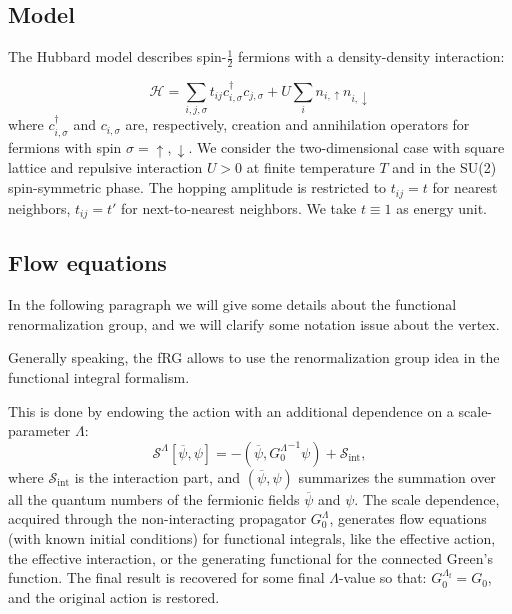 
\subsection{Model}

The Hubbard model\cite{Hubbard1963} describes spin-$\frac{1}{2}$ fermions with a density-density interaction:

\begin{equation}
\mathcal{H} = \sum_{i,j,\sigma} t_{ij} c^{\dagger}_{i,\sigma} c_{j,\sigma} + U \sum_{i} n_{i,\uparrow} n_{i,\downarrow}
\end{equation}
where $c^{\dagger}_{i,\sigma}$ and $c_{i,\sigma}$ are, respectively, creation and annihilation operators 
for fermions with spin $\sigma=\uparrow,\downarrow$. We consider the two-dimensional case with square lattice and repulsive interaction $U>0$ at finite temperature $T$ and in the SU(2) spin-symmetric phase. The hopping amplitude is restricted to $t_{ij} = t$ for nearest neighbors, $t_{ij}=t'$ for next-to-nearest neighbors. We take $t\equiv1$ as energy unit. 


\subsection{Flow equations}


In the following paragraph we will give some details about the functional renormalization group\cite{Metzner2012,Platt2013}, and we will clarify some notation issue about the vertex. 

Generally speaking, the fRG allows to use the renormalization group idea in the functional integral formalism. 

This is done by endowing the action with an additional dependence on a scale-parameter $\Lambda$:\cite{Metzner2012,Platt2013} 
\begin{equation}
 \mathcal{S}^\Lambda[\overline\psi,\psi]=
-(\overline\psi,{G_0^\Lambda}^{-1}\psi)+\mathcal{S}_{\mathrm{int}},  
\end{equation} 
where $\mathcal{S}_{\mathrm{int}}$ is the interaction part, and $(\overline\psi,\psi)$ summarizes the summation over all the quantum numbers of the fermionic fields  $\overline \psi$ and $\psi$. 
The scale dependence, acquired through the non-interacting propagator $G_0^\Lambda$, generates flow equations\cite{Wetterich1993} (with known initial conditions) for functional integrals, like the effective action, the effective interaction, or the generating functional for the connected Green's function. 
The final result is recovered for some final $\Lambda$-value so that: $G_0^{\Lambda_\mathrm{f}} = G_0$, and the original action is restored.  

